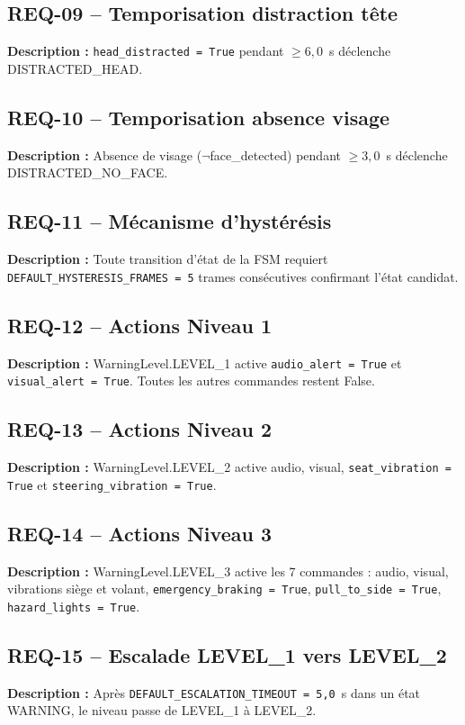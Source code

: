 \documentclass[12pt,a4paper]{report}
\begin{document}
\subsection*{REQ-09 -- Temporisation distraction t\^ete}
\textbf{Description :} \texttt{head\_distracted = True} pendant $\geq 6{,}0$~s d\'eclenche DISTRACTED\_HEAD.

\subsection*{REQ-10 -- Temporisation absence visage}
\textbf{Description :} Absence de visage ($\neg$face\_detected) pendant $\geq 3{,}0$~s d\'eclenche DISTRACTED\_NO\_FACE.

\subsection*{REQ-11 -- M\'ecanisme d'hyst\'er\'esis}
\textbf{Description :} Toute transition d'\'etat de la FSM requiert \texttt{DEFAULT\_HYSTERESIS\_FRAMES = 5} trames cons\'ecutives confirmant l'\'etat candidat.

\subsection*{REQ-12 -- Actions Niveau 1}
\textbf{Description :} WarningLevel.LEVEL\_1 active \texttt{audio\_alert = True} et \texttt{visual\_alert = True}. Toutes les autres commandes restent False.

\subsection*{REQ-13 -- Actions Niveau 2}
\textbf{Description :} WarningLevel.LEVEL\_2 active audio, visual, \texttt{seat\_vibration = True} et \texttt{steering\_vibration = True}.

\subsection*{REQ-14 -- Actions Niveau 3}
\textbf{Description :} WarningLevel.LEVEL\_3 active les 7 commandes : audio, visual, vibrations si\`ege et volant, \texttt{emergency\_braking = True}, \texttt{pull\_to\_side = True}, \texttt{hazard\_lights = True}.

\subsection*{REQ-15 -- Escalade LEVEL\_1 vers LEVEL\_2}
\textbf{Description :} Apr\`es \texttt{DEFAULT\_ESCALATION\_TIMEOUT = 5{,}0}~s dans un \'etat WARNING, le niveau passe de LEVEL\_1 \`a LEVEL\_2.
\end{document}
